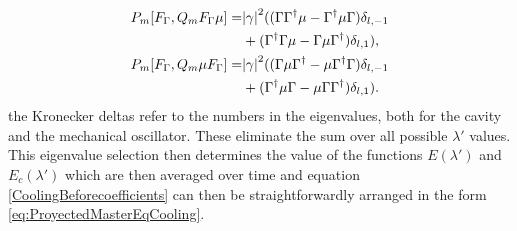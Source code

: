 \documentclass[reprint, amsmath,amssymb, aps,pra]{revtex4-1}
\begin{document}
\begin{align}\label{CoolingBeforecoefficients}
P_m[F_\Gamma,Q_m F_\Gamma \mu] =& \abs{\gamma}^2((\Gamma\Gamma^\dagger \mu - \Gamma^\dagger \mu  \Gamma)\delta_{l,-1} \\
&+ (\Gamma^\dagger\Gamma \mu - \Gamma \mu  \Gamma^\dagger)\delta_{l,1}),\nonumber \\
P_m[F_\Gamma,Q_m  \mu F_\Gamma] =& \abs{\gamma}^2((\Gamma\mu\Gamma^\dagger  - \mu\Gamma^\dagger   \Gamma)\delta_{l,-1}\\ 
&+ (\Gamma^\dagger \mu\Gamma -  \mu \Gamma \Gamma^\dagger)\delta_{l,1}). \nonumber
\end{align} the Kronecker deltas refer to the numbers in the eigenvalues, both for the cavity and the mechanical oscillator. These eliminate the sum over all possible $\lambda'$ values. This eigenvalue selection then determines the value of the functions $E(\lambda')$ and $E_c(\lambda')$ which are then averaged over time and equation \eqref{CoolingBeforecoefficients} can then be straightforwardly arranged in the form \eqref{eq:ProyectedMasterEqCooling}.













\end{document}
